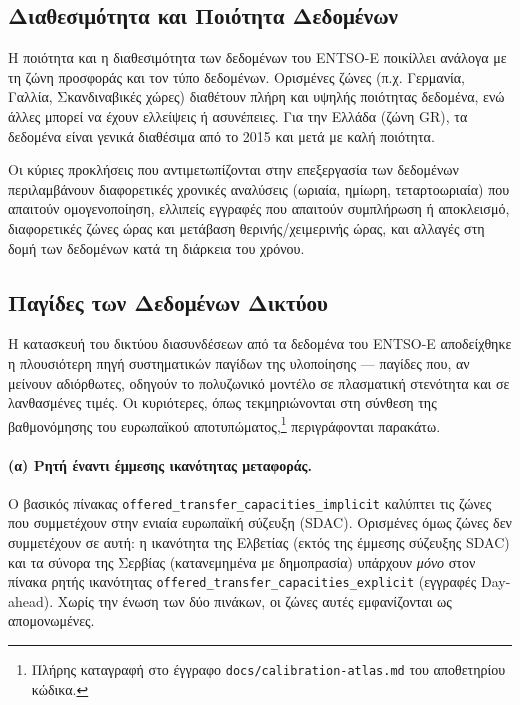 \subsection{Διαθεσιμότητα και Ποιότητα Δεδομένων}
\label{subsec:data-quality}

Η ποιότητα και η διαθεσιμότητα των δεδομένων του ENTSO-E ποικίλλει ανάλογα με τη ζώνη προσφοράς και τον τύπο δεδομένων. Ορισμένες ζώνες (π.χ. Γερμανία, Γαλλία, Σκανδιναβικές χώρες) διαθέτουν πλήρη και υψηλής ποιότητας δεδομένα, ενώ άλλες μπορεί να έχουν ελλείψεις ή ασυνέπειες. Για την Ελλάδα (ζώνη GR), τα δεδομένα είναι γενικά διαθέσιμα από το 2015 και μετά με καλή ποιότητα.

Οι κύριες προκλήσεις που αντιμετωπίζονται στην επεξεργασία των δεδομένων περιλαμβάνουν διαφορετικές χρονικές αναλύσεις (ωριαία, ημίωρη, τεταρτοωριαία) που απαιτούν ομογενοποίηση, ελλιπείς εγγραφές που απαιτούν συμπλήρωση ή αποκλεισμό, διαφορετικές ζώνες ώρας και μετάβαση θερινής/χειμερινής ώρας, και αλλαγές στη δομή των δεδομένων κατά τη διάρκεια του χρόνου.

\subsection{Παγίδες των Δεδομένων Δικτύου}
\label{subsec:network-data-pitfalls}

Η κατασκευή του δικτύου διασυνδέσεων από τα δεδομένα του ENTSO-E αποδείχθηκε η πλουσιότερη πηγή συστηματικών παγίδων της υλοποίησης --- παγίδες που, αν μείνουν αδιόρθωτες, οδηγούν το πολυζωνικό μοντέλο σε πλασματική στενότητα και σε λανθασμένες τιμές. Οι κυριότερες, όπως τεκμηριώνονται στη σύνθεση της βαθμονόμησης του ευρωπαϊκού αποτυπώματος,\footnote{Πλήρης καταγραφή στο έγγραφο \texttt{docs/calibration-atlas.md} του αποθετηρίου κώδικα.} περιγράφονται παρακάτω.

\paragraph{(α) Ρητή έναντι έμμεσης ικανότητας μεταφοράς.}
Ο βασικός πίνακας \texttt{offered\_transfer\_capacities\_implicit} καλύπτει τις ζώνες που συμμετέχουν στην ενιαία ευρωπαϊκή σύζευξη (SDAC). Ορισμένες όμως ζώνες δεν συμμετέχουν σε αυτή: η ικανότητα της Ελβετίας (εκτός της έμμεσης σύζευξης SDAC) και τα σύνορα της Σερβίας (κατανεμημένα με δημοπρασία) υπάρχουν \emph{μόνο} στον πίνακα ρητής ικανότητας \texttt{offered\_transfer\_capacities\_explicit} (εγγραφές Day-ahead). Χωρίς την ένωση των δύο πινάκων, οι ζώνες αυτές εμφανίζονται ως απομονωμένες.

